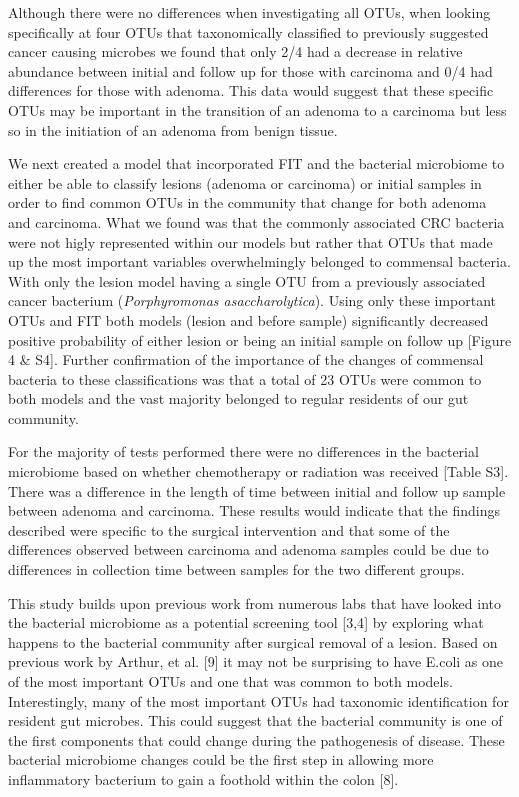 \documentclass[12pt,]{article}
\begin{document}
Although there were no differences when investigating all OTUs, when
looking specifically at four OTUs that taxonomically classified to
previously suggested cancer causing microbes we found that only 2/4 had
a decrease in relative abundance between initial and follow up for those
with carcinoma and 0/4 had differences for those with adenoma. This data
would suggest that these specific OTUs may be important in the
transition of an adenoma to a carcinoma but less so in the initiation of
an adenoma from benign tissue.

We next created a model that incorporated FIT and the bacterial
microbiome to either be able to classify lesions (adenoma or carcinoma)
or initial samples in order to find common OTUs in the community that
change for both adenoma and carcinoma. What we found was that the
commonly associated CRC bacteria were not higly represented within our
models but rather that OTUs that made up the most important variables
overwhelmingly belonged to commensal bacteria. With only the lesion
model having a single OTU from a previously associated cancer bacterium
(\emph{Porphyromonas asaccharolytica}). Using only these important OTUs
and FIT both models (lesion and before sample) significantly decreased
positive probability of either lesion or being an initial sample on
follow up {[}Figure 4 \& S4{]}. Further confirmation of the importance
of the changes of commensal bacteria to these classifications was that a
total of 23 OTUs were common to both models and the vast majority
belonged to regular residents of our gut community.

For the majority of tests performed there were no differences in the
bacterial microbiome based on whether chemotherapy or radiation was
received {[}Table S3{]}. There was a difference in the length of time
between initial and follow up sample between adenoma and carcinoma.
These results would indicate that the findings described were specific
to the surgical intervention and that some of the differences observed
between carcinoma and adenoma samples could be due to differences in
collection time between samples for the two different groups.

This study builds upon previous work from numerous labs that have looked
into the bacterial microbiome as a potential screening tool {[}3,4{]} by
exploring what happens to the bacterial community after surgical removal
of a lesion. Based on previous work by Arthur, et al. {[}9{]} it may not
be surprising to have E.coli as one of the most important OTUs and one
that was common to both models. Interestingly, many of the most
important OTUs had taxonomic identification for resident gut microbes.
This could suggest that the bacterial community is one of the first
components that could change during the pathogenesis of disease. These
bacterial microbiome changes could be the first step in allowing more
inflammatory bacterium to gain a foothold within the colon {[}8{]}.
\end{document}

